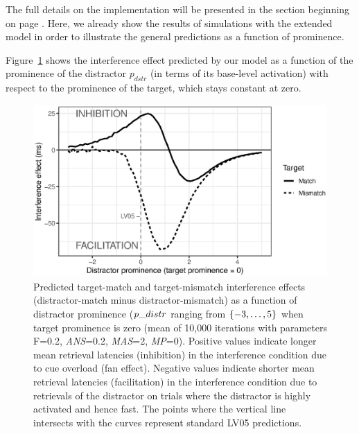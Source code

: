 \documentclass{cambridge7A}\usepackage[]{graphicx}\usepackage[]{color}
\newenvironment{knitrout}{}{} %
\begin{document}
The full details on the implementation will be presented in the section beginning on page \pageref{sec:impl}. Here, we already show the results of simulations with the extended model in order to illustrate the general predictions as a function of prominence.

Figure~\ref{fig:prominenceNew} shows the interference effect predicted by  our model as a function of the prominence of the distractor $p_{dstr}$ (in terms of its base-level activation) with respect to the prominence of the target, which stays constant at zero. 

\begin{figure}[!htbp]
\centering
\begin{knitrout}
\color{fgcolor}

{\centering \includegraphics[width=.8\textwidth]{figures/fig-prominenceNew-1} 

}



\end{knitrout}
 \caption{Predicted target-match and target-mismatch interference effects (distractor-match minus distractor-mismatch) as a function of distractor prominence ($\protect p\_{distr}$ ranging from $\protect\{-3,\dots,5\}$ when target prominence is zero (mean of 10,000 iterations with parameters F=0.2, \textit{ANS}=0.2, \textit{MAS}=2, \textit{MP}=0). Positive values indicate longer mean retrieval latencies (inhibition) in the interference condition due to  cue overload  (fan effect). Negative values indicate shorter mean retrieval latencies (facilitation) in the interference condition due to retrievals of the distractor on trials where the distractor is highly activated and hence fast. The points where the vertical line intersects with the curves represent standard LV05 predictions.}\label{fig:prominenceNew} 
\end{figure}
\end{document}
